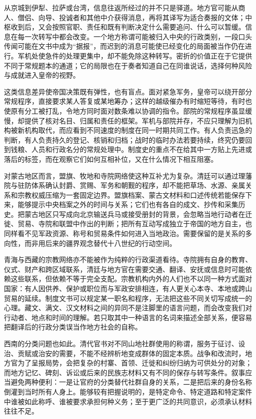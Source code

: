 从京城到伊犁、拉萨或台湾，信息往返所经过的并不只是驿道。地方官可能从商人、僧侣、向导、投诚者和其他中介获得消息，再将其译写为适合奏报的文体；中枢收到后，又会按照官职、责任和既有判断决定什么需要追问、什么可以暂缓。信息在每一次转写中都会改变。一个地方称谓可能被归入中央的行政类别，一段口头传闻可能在文书中成为“据报”，而迟到的消息可能使已经变化的局面被当作仍在进行。军机处使急件的处理更集中，却不能免除这种转写。密折的价值正在于它提供不同于常规题本的通道；它的局限也在于奏者知道自己在同谁说话，选择何种风险与成就进入皇帝的视野。

这类信息差异使帝国决策既有弹性，也有盲点。面对紧急军务，皇帝可以绕开部分常规程序，直接要求某人答复或某地筹办；这样的越级催办有时缩短等待，有时也使原有分工被打乱，令地方同时面对数条难以协调的指令。部院的常规程序虽显缓慢，却提供了核对名目、归属和责任的框架。军机与部院并存，不应只理解为旧机构被新机构取代，而应看到不同速度的制度在同一时期共同工作。有人负责迅急的判断，有人负责持久的登记、核销和归档；战时的临时办法若要持续，终究仍要回到钱粮、人员和行政名分的常规处理中。制度史的重点不在给其中一方贴上先进或落后的标签，而在观察它们如何互相补位，又在什么情况下相互阻塞。

对蒙古地区而言，盟旗、牧地和寺院网络使这种互补尤为复杂。清廷可以通过理藩院与驻防体系确认封爵、赏赐、军务和朝觐的程序，却不能把草场、水源、亲属关系和宗教权威压缩为一套固定边界。盟旗档案、蒙古文材料和口述传统若能保存下来，能够提示中央档案之外的时间与关系；它们也有各自的成文、抄传和采集历史。把蒙古地区只写成向北京输送兵马或接受册封的背景，会忽略当地行动者在迁徙、贸易、寺院和联盟中作出的判断；把所有互动写成独立于帝国的地方自主，也同样看不见军政资源、称号和贸易条件如何进入当地政治。需要保留的是关系的多向性，而非用后来的疆界观念替代十八世纪的行动空间。

青海与西藏的宗教网络亦不能被作为纯粹的行政渠道看待。寺院拥有自身的教育、仪式、财产和跨区域联系，清廷与地方官在需要交通、翻译、安抚或信息时可能依赖这些联系，但依赖不等于完全支配。宗教机构内外的人们也不以同一种方式面对国家：有人因供养、保护或职位而与军政安排相连，有人更关心本寺、本地或跨山贸易的延续。制度文书可以规定某一职名和程序，无法把这些不同关切写成统一的心理。藏文、满文、汉文材料之间的异同不是注脚里的语言问题，而会改变我们对行动者、地点和时间的理解。若只取其中一种语言的名词来描述全部关系，便容易把翻译后的行政分类误当作地方社会的自称。

西南的分类问题也如此。清代官书对不同山地社群使用的称谓，服务于征讨、设治、贡赋或治安的需要，不能不经辨析地变成群体的固定本质。战争和改流时，地方官为了呈报局势，会把复杂的村寨、首领、迁徙和纠纷归纳为可供处分的对象；而地方记忆、碑刻、诉讼或后来的民族志材料又有不同的保存与转写条件。叙事应当避免两种便利：一是让官府的分类替代社群自身的关系，二是把后来的身份名称倒灌到当时所有人身上。能够较有把握说明的，是特定命令、特定道路和特定案件中谁被如此称呼、谁被要求承担何种义务；至于更广泛的共同意识，必须承认材料往往不足。

